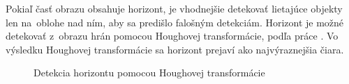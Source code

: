         Pokiaľ časť obrazu obsahuje horizont, je vhodnejšie detekovať lietajúce objekty len na~oblohe nad ním, aby sa predišlo falošným detekciám. Horizont je možné detekovať z~obrazu hrán pomocou Houghovej transformácie, podľa práce \cite{Janousek2018}. Vo výsledku Houghovej transformácie sa horizont prejaví ako najvýraznejšia čiara.


        \begin{figure}[H]
            \centering
            \caption{Detekcia horizontu pomocou Houghovej transformácie}
        \end{figure}



